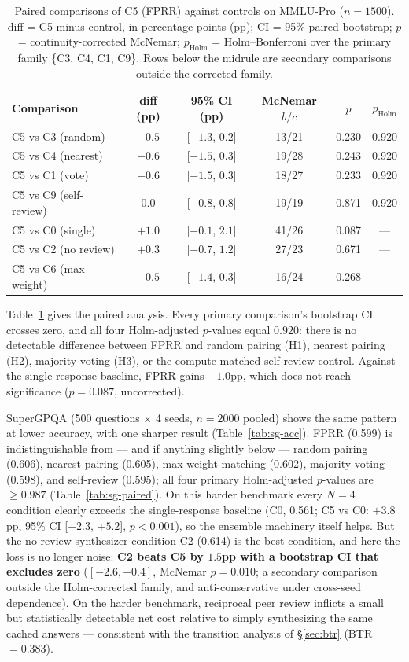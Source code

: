 \documentclass[11pt]{article}
\begin{document}
\begin{table}[t]
\centering
\small
\caption{Paired comparisons of C5 (FPRR) against controls on MMLU-Pro ($n=1500$). diff = C5 minus control, in percentage points (pp); CI = 95\% paired bootstrap; $p$ = continuity-corrected McNemar; $p_{\mathrm{Holm}}$ = Holm--Bonferroni over the primary family \{C3, C4, C1, C9\}. Rows below the midrule are secondary comparisons outside the corrected family.}
\label{tab:mmlu-paired}
\begin{tabular}{lccccc}
\toprule
Comparison & diff (pp) & 95\% CI (pp) & McNemar $b/c$ & $p$ & $p_{\mathrm{Holm}}$ \\
\midrule
C5 vs C3 (random)      & $-0.5$ & [$-1.3$, $0.2$] & 13/21 & 0.230 & 0.920 \\
C5 vs C4 (nearest)     & $-0.6$ & [$-1.5$, $0.3$] & 19/28 & 0.243 & 0.920 \\
C5 vs C1 (vote)        & $-0.6$ & [$-1.5$, $0.3$] & 18/27 & 0.233 & 0.920 \\
C5 vs C9 (self-review) & $0.0$  & [$-0.8$, $0.8$] & 19/19 & 0.871 & 0.920 \\
\midrule
C5 vs C0 (single)      & $+1.0$ & [$-0.1$, $2.1$] & 41/26 & 0.087 & --- \\
C5 vs C2 (no review)   & $+0.3$ & [$-0.7$, $1.2$] & 27/23 & 0.671 & --- \\
C5 vs C6 (max-weight)  & $-0.5$ & [$-1.4$, $0.3$] & 16/24 & 0.268 & --- \\
\bottomrule
\end{tabular}
\end{table}

Table~\ref{tab:mmlu-paired} gives the paired analysis. Every primary comparison's bootstrap CI crosses zero, and all four Holm-adjusted $p$-values equal $0.920$: there is no detectable difference between FPRR and random pairing (H1), nearest pairing (H2), majority voting (H3), or the compute-matched self-review control. Against the single-response baseline, FPRR gains $+1.0$pp, which does not reach significance ($p=0.087$, uncorrected).

SuperGPQA (500 questions $\times$ 4 seeds, $n=2000$ pooled) shows the same pattern at lower accuracy, with one sharper result (Table~\ref{tab:sg-acc}). FPRR (0.599) is indistinguishable from --- and if anything slightly below --- random pairing (0.606), nearest pairing (0.605), max-weight matching (0.602), majority voting (0.598), and self-review (0.595); all four primary Holm-adjusted $p$-values are $\ge 0.987$ (Table~\ref{tab:sg-paired}). On this harder benchmark every $N{=}4$ condition clearly exceeds the single-response baseline (C0, 0.561; C5 vs C0: $+3.8$pp, 95\% CI [$+2.3$, $+5.2$], $p<0.001$), so the ensemble machinery itself helps. But the no-review synthesizer condition C2 (0.614) is the best condition, and here the loss is no longer noise: \textbf{C2 beats C5 by $1.5$pp with a bootstrap CI that excludes zero} ($[-2.6, -0.4]$, McNemar $p=0.010$; a secondary comparison outside the Holm-corrected family, and anti-conservative under cross-seed dependence). On the harder benchmark, reciprocal peer review inflicts a small but statistically detectable net cost relative to simply synthesizing the same cached answers --- consistent with the transition analysis of \S\ref{sec:btr} (BTR $= 0.383$).
\end{document}
